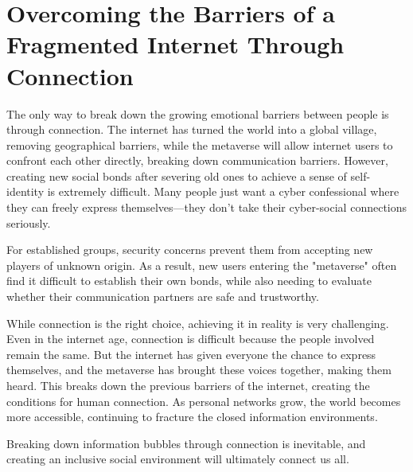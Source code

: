 \documentclass[]{article}
\begin{document}
	\section{Overcoming the Barriers of a Fragmented Internet Through Connection}
	The only way to break down the growing emotional barriers between people is through connection. The internet has turned the world into a global village, removing geographical barriers, while the metaverse will allow internet users to confront each other directly, breaking down communication barriers. However, creating new social bonds after severing old ones to achieve a sense of self-identity is extremely difficult. Many people just want a cyber confessional where they can freely express themselves—they don’t take their cyber-social connections seriously.
	
	For established groups, security concerns prevent them from accepting new players of unknown origin. As a result, new users entering the "metaverse" often find it difficult to establish their own bonds, while also needing to evaluate whether their communication partners are safe and trustworthy.
	
	While connection is the right choice, achieving it in reality is very challenging. Even in the internet age, connection is difficult because the people involved remain the same. But the internet has given everyone the chance to express themselves, and the metaverse has brought these voices together, making them heard. This breaks down the previous barriers of the internet, creating the conditions for human connection. As personal networks grow, the world becomes more accessible, continuing to fracture the closed information environments.
	
	Breaking down information bubbles through connection is inevitable, and creating an inclusive social environment will ultimately connect us all.
\end{document}

